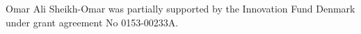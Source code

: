 \documentclass[11pt]{article}
\begin{document}
Omar Ali Sheikh-Omar was partially supported by the Innovation Fund Denmark under grant agreement No 0153-00233A.




\newpage


%
%
%
%
%
%
\end{document}
